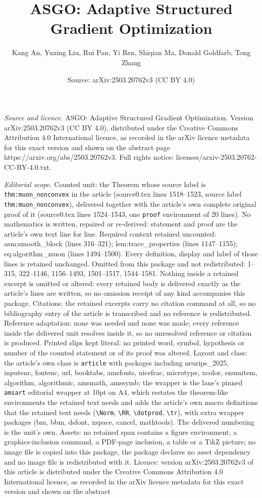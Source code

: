 \documentclass[10pt,a4paper]{amsart}
\title[ASGO: Adaptive Structured Gradient Optimization]{ASGO: Adaptive Structured Gradient Optimization}
\author{Kang An, Yuxing Liu, Rui Pan, Yi Ren, Shiqian Ma, Donald Goldfarb, Tong Zhang}
\date{Source: arXiv:2503.20762v3 (CC BY 4.0)}
\begin{document}
\maketitle

\noindent\emph{Source and licence.} ASGO: Adaptive Structured Gradient Optimization. Version arXiv:2503.20762v3 (CC BY 4.0), distributed under the Creative Commons Attribution 4.0 International licence, as recorded in the arXiv licence metadata for this exact version and shown on the abstract page https://arxiv.org/abs/2503.20762v3. Full rights notice: licenses/arxiv-2503.20762-CC-BY-4.0.txt.\par\smallskip

\noindent\textit{Editorial scope.} Counted unit: the Theorem whose source label is \texttt{thm:muon\_nonconvex} in the article (source0.tex lines 1518--1523, source label \texttt{thm:muon\_nonconvex}), delivered together with the article's own complete original proof of it (source0.tex lines 1524--1543, one \texttt{proof} environment of 20 lines). No mathematics is written, repaired or re-derived: statement and proof are the article's own text line for line. Required context retained uncounted: asm:smooth\_block (lines 316--321); lem:trace\_properties (lines 1147--1155); eq:algorithm\_muon (lines 1494--1500). Every definition, display and label of those lines is retained unchanged. Omitted from this package and not redistributed: 1--315, 322--1146, 1156--1493, 1501--1517, 1544--1581. Nothing inside a retained excerpt is omitted or altered: every retained body is delivered exactly as the article's lines are written, so no omission receipt of any kind accompanies this package. Citations: the retained excerpts carry no citation command at all, so no bibliography entry of the article is transcribed and no reference is redistributed. Reference adaptation: none was needed and none was made; every reference inside the delivered unit resolves inside it, so no unresolved reference or citation is produced. Printed slips kept literal: no printed word, symbol, hypothesis or number of the counted statement or of its proof was altered. Layout and class: the article's own class is \texttt{article} with packages including neurips\_2025, inputenc, fontenc, url, booktabs, amsfonts, nicefrac, microtype, xcolor, enumitem, algorithm, algorithmic, amsmath, amssymb; the wrapper is the lane's pinned \texttt{amsart} editorial wrapper at 10pt on A4, which restates the theorem-like environments the retained text needs and adds the article's own macro definitions that the retained text needs (\texttt{\textbackslash Norm}, \texttt{\textbackslash RR}, \texttt{\textbackslash dotprod}, \texttt{\textbackslash tr}), with extra wrapper packages (bm, bbm, dsfont, xspace, cancel, mathtools). The delivered numbering is the unit's own. Assets: no retained span contains a figure environment, a graphics-inclusion command, a PDF-page inclusion, a table or a TikZ picture; no image file is copied into this package, the package declares no asset dependency and no image file is redistributed with it. Licence: version arXiv:2503.20762v3 of this article is distributed under the Creative Commons Attribution 4.0 International licence, as recorded in the arXiv licence metadata for this exact version and shown on the abstract 
\end{document}
